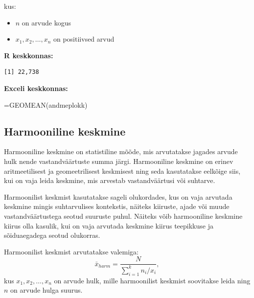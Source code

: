 \documentclass[
]{book}
\newenvironment{Shaded}{\begin{snugshade}}{\end{snugshade}}
\newcommand{\CommentTok}[1]{\textcolor[rgb]{0.56,0.35,0.01}{\textit{#1}}}
\newcommand{\FunctionTok}[1]{\textcolor[rgb]{0.13,0.29,0.53}{\textbf{#1}}}
\newcommand{\NormalTok}[1]{#1}
\newcommand{\SpecialCharTok}[1]{\textcolor[rgb]{0.81,0.36,0.00}{\textbf{#1}}}
\providecommand{\tightlist}{%
  \setlength{\itemsep}{0pt}\setlength{\parskip}{0pt}}
\renewenvironment{Shaded} {\begin{snugshade}\footnotesize} {\end{snugshade}}
\begin{document}
kus:

\begin{itemize}
\tightlist
\item
  \(n\) on arvude kogus
\item
  \(x_1, x_2, \ldots, x_n\) on positiivsed arvud
\end{itemize}

\textbf{R keskkonnas:}

\begin{Shaded}
\end{Shaded}

\begin{verbatim}
[1] 22,738
\end{verbatim}

\textbf{Exceli keskkonnas:}

\begin{naideExcel}
=GEOMEAN(andmeplokk)

\end{naideExcel}

\subsection{Harmooniline keskmine}\label{harmooniline-keskmine}

Harmooniline keskmine on statistiline mõõde, mis arvutatakse jagades arvude hulk nende vastandväärtuste summa järgi. Harmooniline keskmine on erinev aritmeetilisest ja geomeetrilisest keskmisest ning seda kasutatakse eelkõige siis, kui on vaja leida keskmine, mis arvestab vastandväärtusi või suhtarve.

Harmoonilist keskmist kasutatakse sageli olukordades, kus on vaja arvutada keskmine mingis suhtarvulises kontekstis, näiteks kiiruste, ajade või muude vastandväärtustega seotud suuruste puhul. Näiteks võib harmooniline keskmine kiirus olla kasulik, kui on vaja arvutada keskmine kiirus teepikkuse ja sõiduaegadega seotud olukorras.

Harmoonilist keskmist arvutatakse valemiga:
\[\bar x_{harm} = \frac{N}{\sum_{i=1}^k n_i / x_i},\]
kus \(x_{1}, x_{2}, \ldots, x_{n}\) on arvude hulk, mille harmoonilist keskmist soovitakse leida ning \(n\) on arvude hulga suurus.
\end{document}
